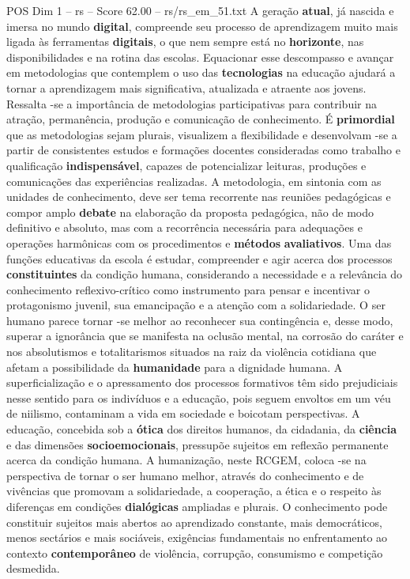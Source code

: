 \begin{textsample}{POS Dim 1 – rs – Score 62.00 – rs/rs\_em\_51.txt}
A geração \textbf{atual}, já nascida e imersa no mundo \textbf{digital}, compreende seu processo de aprendizagem muito mais ligada às ferramentas \textbf{digitais}, o que nem sempre está no \textbf{horizonte}, nas disponibilidades e na rotina das escolas.
Equacionar esse descompasso e avançar em metodologias que contemplem o uso das \textbf{tecnologias} na educação ajudará a tornar a aprendizagem mais significativa, atualizada e atraente aos jovens.
Ressalta -se a importância de metodologias participativas para contribuir na atração, permanência, produção e comunicação de conhecimento.
É \textbf{primordial} que as metodologias sejam plurais, visualizem a flexibilidade e desenvolvam -se a partir de consistentes estudos e formações docentes consideradas como trabalho e qualificação \textbf{indispensável}, capazes de potencializar leituras, produções e comunicações das experiências realizadas.
A metodologia, em sintonia com as unidades de conhecimento, deve ser tema recorrente nas reuniões pedagógicas e compor amplo \textbf{debate} na elaboração da proposta pedagógica, não de modo definitivo e absoluto, mas com a recorrência necessária para adequações e operações harmônicas com os procedimentos e \textbf{métodos} \textbf{avaliativos}.
Uma das funções educativas da escola é estudar, compreender e agir acerca dos processos \textbf{constituintes} da condição humana, considerando a necessidade e a relevância do conhecimento reflexivo-crítico como instrumento para pensar e incentivar o protagonismo juvenil, sua emancipação e a atenção com a solidariedade.
O ser humano parece tornar -se melhor ao reconhecer sua contingência e, desse modo, superar a ignorância que se manifesta na oclusão mental, na corrosão do caráter e nos absolutismos e totalitarismos situados na raiz da violência cotidiana que afetam a possibilidade da \textbf{humanidade} para a dignidade humana.
A superficialização e o apressamento dos processos formativos têm sido prejudiciais nesse sentido para os indivíduos e a educação, pois seguem envoltos em um véu de niilismo, contaminam a vida em sociedade e boicotam perspectivas.
A educação, concebida sob a \textbf{ótica} dos direitos humanos, da cidadania, da \textbf{ciência} e das dimensões \textbf{socioemocionais}, pressupõe sujeitos em reflexão permanente acerca da condição humana.
A humanização, neste RCGEM, coloca -se na perspectiva de tornar o ser humano melhor, através do conhecimento e de vivências que promovam a solidariedade, a cooperação, a ética e o respeito às diferenças em condições \textbf{dialógicas} ampliadas e plurais.
O conhecimento pode constituir sujeitos mais abertos ao aprendizado constante, mais democráticos, menos sectários e mais sociáveis, exigências fundamentais no enfrentamento ao contexto \textbf{contemporâneo} de violência, corrupção, consumismo e competição desmedida.

\end{textsample}
